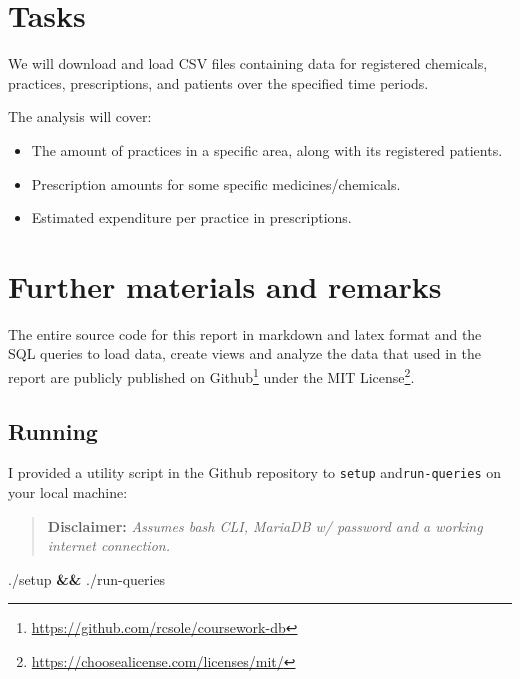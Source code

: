 \documentclass[english,a4paper,]{report}
\newenvironment{Shaded}{}{}
\newcommand{\KeywordTok}[1]{\textcolor[rgb]{0.00,0.44,0.13}{\textbf{#1}}}
\newcommand{\ExtensionTok}[1]{#1}
\renewcommand{\href}[2]{#2\footnote{\url{#1}}}
\providecommand{\tightlist}{%
  \setlength{\itemsep}{0pt}\setlength{\parskip}{0pt}}
\begin{document}
\section{Tasks}\label{tasks}

We will download and load CSV files containing data for registered
chemicals, practices, prescriptions, and patients over the specified
time periods.

The analysis will cover:

\begin{itemize}
\tightlist
\item
  The amount of practices in a specific area, along with its registered
  patients.
\item
  Prescription amounts for some specific medicines/chemicals.
\item
  Estimated expenditure per practice in prescriptions.
\end{itemize}

\section{Further materials and
remarks}\label{further-materials-and-remarks}

The entire source code for this report in markdown and latex format and
the SQL queries to load data, create views and analyze the data that
used in the report are publicly published on
\href{https://github.com/rcsole/coursework-db}{Github} under the
\href{https://choosealicense.com/licenses/mit/}{MIT License}.

\subsection{Running}\label{running}

I provided a utility script in the Github repository to \texttt{setup}
and\texttt{run-queries} on your local machine:

\begin{quote}
\textbf{Disclaimer:} \emph{Assumes bash CLI, MariaDB w/ password and a
working internet connection.}
\end{quote}

\begin{Shaded}
\begin{Highlighting}[]
\ExtensionTok{./setup} \KeywordTok{&&} \ExtensionTok{./run-queries}
\end{Highlighting}
\end{Shaded}
\end{document}
